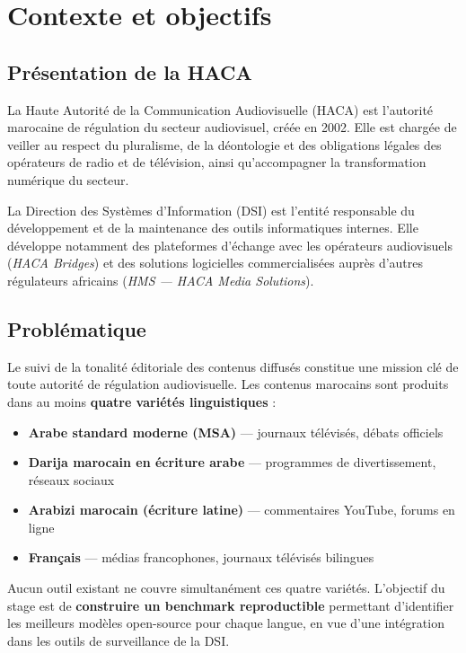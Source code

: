 \documentclass[12pt, a4paper]{article}
\begin{document}
\section{Contexte et objectifs}

\subsection{Présentation de la HACA}

La Haute Autorité de la Communication Audiovisuelle (HACA) est l'autorité
marocaine de régulation du secteur audiovisuel, créée en 2002. Elle est
chargée de veiller au respect du pluralisme, de la déontologie et des
obligations légales des opérateurs de radio et de télévision, ainsi
qu'accompagner la transformation numérique du secteur.

La Direction des Systèmes d'Information (DSI) est l'entité responsable
du développement et de la maintenance des outils informatiques internes.
Elle développe notamment des plateformes d'échange avec les opérateurs
audiovisuels (\textit{HACA Bridges}) et des solutions logicielles
commercialisées auprès d'autres régulateurs africains (\textit{HMS —
HACA Media Solutions}).

\subsection{Problématique}

Le suivi de la tonalité éditoriale des contenus diffusés constitue une
mission clé de toute autorité de régulation audiovisuelle. Les contenus
marocains sont produits dans au moins \textbf{quatre variétés linguistiques} :

\begin{itemize}
  \item \textbf{Arabe standard moderne (MSA)} — journaux télévisés, débats officiels
  \item \textbf{Darija marocain en écriture arabe} — programmes de divertissement, réseaux sociaux
  \item \textbf{Arabizi marocain (écriture latine)} — commentaires YouTube, forums en ligne
  \item \textbf{Français} — médias francophones, journaux télévisés bilingues
\end{itemize}

Aucun outil existant ne couvre simultanément ces quatre variétés. L'objectif
du stage est de \textbf{construire un benchmark reproductible} permettant
d'identifier les meilleurs modèles open-source pour chaque langue, en vue
d'une intégration dans les outils de surveillance de la DSI.
\end{document}
